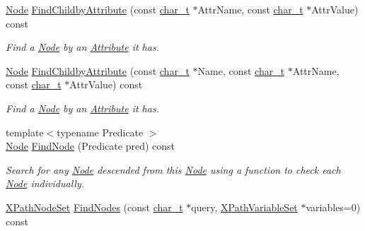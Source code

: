 \begin{DoxyCompactItemize}
\hyperlink{classMezzanine_1_1xml_1_1Node}{Node} \hyperlink{classMezzanine_1_1xml_1_1Node_ac30702431eb19fa0749e989c434ea090}{FindChildbyAttribute} (const \hyperlink{namespaceMezzanine_1_1xml_a29b8a47c179e9895c4e9e66c45d1dbbc}{char\_\-t} $\ast$AttrName, const \hyperlink{namespaceMezzanine_1_1xml_a29b8a47c179e9895c4e9e66c45d1dbbc}{char\_\-t} $\ast$AttrValue) const 
\begin{DoxyCompactList}\small\item\em Find a \hyperlink{classMezzanine_1_1xml_1_1Node}{Node} by an \hyperlink{classMezzanine_1_1xml_1_1Attribute}{Attribute} it has. \item\end{DoxyCompactList}\item 
\hyperlink{classMezzanine_1_1xml_1_1Node}{Node} \hyperlink{classMezzanine_1_1xml_1_1Node_a8263cc80d5f2977fc89823ba38952777}{FindChildbyAttribute} (const \hyperlink{namespaceMezzanine_1_1xml_a29b8a47c179e9895c4e9e66c45d1dbbc}{char\_\-t} $\ast$Name, const \hyperlink{namespaceMezzanine_1_1xml_a29b8a47c179e9895c4e9e66c45d1dbbc}{char\_\-t} $\ast$AttrName, const \hyperlink{namespaceMezzanine_1_1xml_a29b8a47c179e9895c4e9e66c45d1dbbc}{char\_\-t} $\ast$AttrValue) const 
\begin{DoxyCompactList}\small\item\em Find a \hyperlink{classMezzanine_1_1xml_1_1Node}{Node} by an \hyperlink{classMezzanine_1_1xml_1_1Attribute}{Attribute} it has. \item\end{DoxyCompactList}\item 
{\footnotesize template$<$typename Predicate $>$ }\\\hyperlink{classMezzanine_1_1xml_1_1Node}{Node} \hyperlink{classMezzanine_1_1xml_1_1Node_a0f241f6570fd68540578859c189155c8}{FindNode} (Predicate pred) const 
\begin{DoxyCompactList}\small\item\em Search for any \hyperlink{classMezzanine_1_1xml_1_1Node}{Node} descended from this \hyperlink{classMezzanine_1_1xml_1_1Node}{Node} using a function to check each \hyperlink{classMezzanine_1_1xml_1_1Node}{Node} individually. \item\end{DoxyCompactList}\item 
\hyperlink{classMezzanine_1_1xml_1_1XPathNodeSet}{XPathNodeSet} \hyperlink{classMezzanine_1_1xml_1_1Node_abe164532c32aaee48d85ce0b21270352}{FindNodes} (const \hyperlink{namespaceMezzanine_1_1xml_a29b8a47c179e9895c4e9e66c45d1dbbc}{char\_\-t} $\ast$query, \hyperlink{classMezzanine_1_1xml_1_1XPathVariableSet}{XPathVariableSet} $\ast$variables=0) const 

\end{DoxyCompactItemize}
